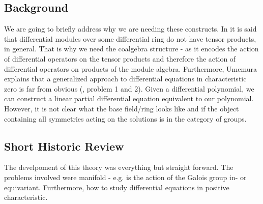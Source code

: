 \subsection{Background}
We are going to briefly address why we are needing these constructs. In \cite{vdPS01} it is said that differential modules over some differential ring do not have tensor products, in general. That is why we need the coalgebra structure - as it encodes the action of differential operators on the tensor products and therefore the action of differential operators on products of the module algebra. Furthermore, Umemura explains that a generalized approach to differential equations in characteristic zero is far from obvious (\cite{Ume96b}, problem 1 and 2). Given a differential polynomial, we can construct a linear partial differential equation equivalent to our polynomial. However, it is not clear what the base field/ring looks like and if the object containing all symmetries acting on the solutions is in the category of groups.
\subsection{Short Historic Review}
The develpoment of this theory was everything but straight forward. The problems involved were manifold - e.g. is the action of the Galois group in- or equivariant. Furthermore, how to study differential equations in positive characteristic.
